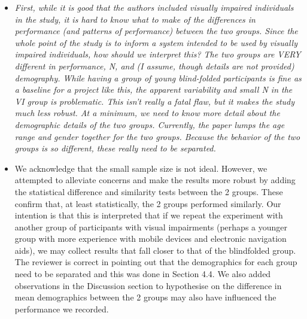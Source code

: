 \documentclass{article}
\begin{document}
\begin{itemize}
  \item \textit{First, while it is good that the authors included visually impaired individuals in the study, it is hard to know what to make of the differences in performance (and patterns of performance) between the two groups. Since the whole point of the study is to inform a system intended to be used by visually impaired individuals, how should we interpret this? The two groups are VERY different in performance, N, and (I assume, though details are not provided) demography. While having a group of young blind-folded participants is fine as a baseline for a project like this, the apparent variability and small N in the VI group is problematic. This isn’t really a fatal flaw, but it makes the study much less robust. At a minimum, we need to know more detail about the demographic details of the two groups. Currently, the paper lumps the age range and gender together for the two groups. Because the behavior of the two groups is so different, these really need to be separated.}
  \item We acknowledge that the small sample size is not ideal.
    However, we attempted to alleviate concerns and make the results more robust by adding the statistical difference and similarity tests between the 2 groups.
    These confirm that, at least statistically, the 2 groups performed similarly.
    Our intention is that this is interpreted that if we repeat the experiment with another group of participants with visual impairments (perhaps a younger group with more experience with mobile devices and electronic navigation aids), we may collect results that fall closer to that of the blindfolded group.
    The reviewer is correct in pointing out that the demographics for each group need to be separated and this was done in Section 4.4.
    We also added observations in the Discussion section to hypothesise on the difference in mean demographics between the 2 groups may also have influenced the performance we recorded. 


\end{itemize}
\end{document}
